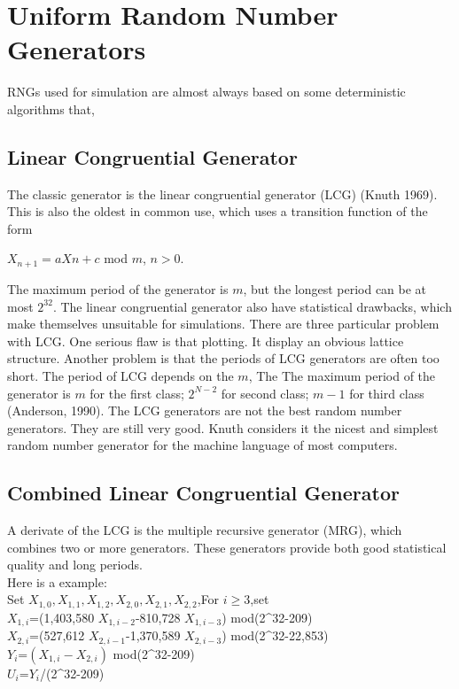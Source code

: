 \documentclass[a4paper,11pt]{article}
\begin{document}
\section{Uniform Random Number Generators}
{RNGs used for simulation are almost always based on some deterministic algorithms that, 

\subsection{Linear Congruential Generator}
{The classic generator is the linear congruential generator (LCG) (Knuth 1969). This is also the oldest in common use, which uses a transition function of the form
\begin{center} $X_{n+1}=aX{n}+c$ mod $m$, $n>0$. 
\end{center}
The maximum period of the generator is $m$, but the longest period can be at most $2^{32}$. The linear congruential generator also have statistical 
drawbacks, which make themselves unsuitable for simulations. There are three particular problem with LCG. One serious flaw is that plotting. It display an obvious lattice 
structure. Another problem is that the periods of LCG generators are often too short. The period of LCG depends on the $m$, The The maximum period of the generator 
is $m$ for the first class; $2^{N-2}$ for second class; $m-1$ for third class (Anderson, 1990). The LCG generators are not the best random number generators. 
They are still very good. Knuth considers it the nicest and simplest random number generator for the machine language of most computers.
}
\subsection{Combined Linear Congruential Generator}
{A derivate of the LCG is the multiple recursive generator (MRG), which combines two or more generators. These generators provide both good statistical quality and long periods.\\
Here is a example:\\
Set
$X_{1,0},X_{1,1},X_{1,2},X_{2,0},X_{2,1},X_{2,2}$,For $i\geqslant 3$,set\\
$X_{1,i}$=(1,403,580 $X_{1,i-2}$-810,728 $X_{1,i-3}$) mod(2^{32}-209)\\
$X_{2,i}$=(527,612 $X_{2,i-1}$-1,370,589 $X_{2,i-3}$) mod(2^{32}-22,853)\\
$Y_i$=$(X_{1,i}-X_{2,i})$ mod(2^{32}-209)\\
$U_i$=$Y_i$/(2^{32}-209)\\
 
}}
\end{document}
